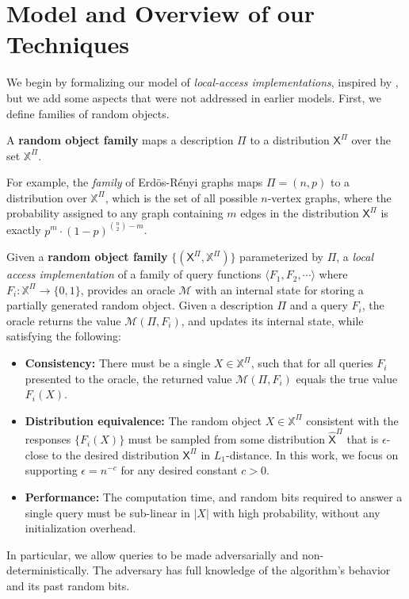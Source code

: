 \section{Model and Overview of our Techniques}
\label{sec:overview_of_our_techniques}
We begin by formalizing our model of \emph{local-access implementations}, inspired by \cite{reut},
but we add some aspects that were not addressed in earlier models.
First, we define families of random objects.

\begin{definition}
\label{def:parametrized_random_object}
A \textbf{random object family} maps a description $\Pi$ to a distribution $\mathsf X^{\Pi}$ over the set $\mathbb X^{\Pi}$.
\end{definition}

For example, the \emph{family} of Erd\"{o}s-R\'{e}nyi graphs maps $\Pi = (n, p)$ to a distribution over $\mathbb X^{\Pi}$,
which is the set of all possible $n$-vertex graphs,
where the probability assigned to any graph containing $m$ edges in the distribution $\mathsf X^{\Pi}$ is exactly $p^m\cdot (1-p)^{\binom{n}{2}-m}$.

\begin{definition}
\label{def:local_access}
Given a \textbf{random object family} $\{(\mathsf X^{\Pi}, \mathbb X^{\Pi})\}$ parameterized by $\Pi$, a \emph{local access implementation}
of a family of query functions $\langle F_1, F_2,\cdots \rangle$ where $F_i: \mathbb X^{\Pi}\rightarrow \{0,1\}$,
provides an oracle $\mathcal M$ with an internal state for storing a partially generated random object.
Given a description $\Pi$ and a query $F_i$, the oracle returns the value $\mathcal M(\Pi, F_i)$,
and updates its internal state, while satisfying the following:
\begin{itemize}
    \item \textbf{Consistency:}
    There must be a single $X\in \mathbb X^{\Pi}$, such that for all queries $F_i$ presented to the oracle,
    the returned value $\mathcal M(\Pi,F_i)$ equals the true value $F_i(X)$.
    \item \textbf{Distribution equivalence:}
    The random object $X\in \mathbb X^{\Pi}$ consistent with the responses $\{ F_i(X)\}$ must be sampled from some distribution $\hat{\mathsf{X}}^{\Pi}$
    that is $\epsilon$-close to the desired distribution $\mathsf{X}^{\Pi}$ in $L_1$-distance.
    In this work, we focus on supporting $\epsilon = n^{-c}$ for any desired constant $c>0$.
    \item \textbf{Performance:}
    The computation time, and random bits required to answer a single query must be sub-linear in $|X|$ with high probability,
    without any initialization overhead.
\end{itemize}
In particular, we allow queries to be made adversarially and non-deterministically.
The adversary has full knowledge of the algorithm's behavior and its past random bits.
\end{definition}

